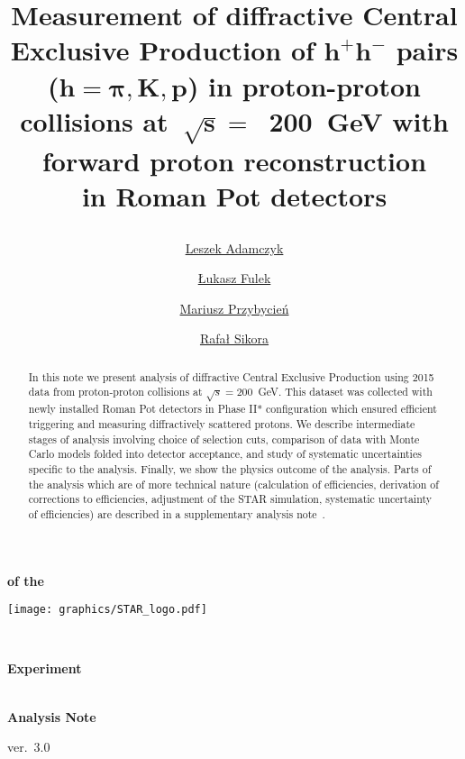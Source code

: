 \documentclass[a4paper,10pt,notitlepage]{report}
\title{%
\centering\hspace*{-0.08\linewidth}\begin{minipage}{1.16\linewidth}\centering%
\textbf{Measurement of diffractive Central Exclusive Production of $\bm{h^{+}h^{-}}$ pairs ($\bm{h=\pi,K,p}$) in proton-proton collisions at~$\bm{\sqrt{s}=}$~200~GeV with forward proton reconstruction\\in Roman Pot detectors}
\end{minipage}%
\vspace*{10pt}}
\author[ ]{\href{mailto:leszek.adamczyk@agh.edu.pl}{Leszek Adamczyk}}
\author[ ]{\href{mailto:lukasz.fulek@fis.agh.edu.pl}{Łukasz Fulek}}
\author[ ]{\href{mailto:mariusz.przybycien@agh.edu.pl}{Mariusz Przybycień}}
\author[ ]{\href{mailto:rafal.sikora@fis.agh.edu.pl}{Rafał Sikora}}
\affil[ ]{AGH University of Science and Technology, FPACS, Kraków, Poland}
\begin{document}
\begin{center}
\begin{minipage}[c]{0.12\linewidth}%
\vspace{5.5pt}\textbf{\LARGE{of the}}
\end{minipage}
\begin{minipage}[c]{0.15\linewidth}%
\hspace*{-8pt}\texttt{[image: graphics/STAR\_logo.pdf]}
\end{minipage}~
\begin{minipage}[c]{0.24\linewidth}%
\vspace{9pt}\hspace*{-8pt}\textbf{\LARGE{Experiment}}
\end{minipage}\\[-50pt]
\textbf{\LARGE{Analysis Note}}

\vspace*{150pt}
\begin{minipage}{\linewidth}
\maketitle
\begin{abstract}
In this note we present analysis of diffractive Central Exclusive Production using 2015 data from proton-proton collisions at $\sqrt{s}=200$~GeV. This dataset was collected with newly installed Roman Pot detectors in Phase II* configuration which ensured efficient triggering and measuring diffractively scattered protons. We describe intermediate stages of analysis involving choice of selection cuts, comparison of data with Monte Carlo models folded into detector acceptance, and study of systematic uncertainties specific to the analysis. Finally, we show the physics outcome of the analysis. Parts of the analysis which are of more technical nature (calculation of efficiencies, derivation of corrections to efficiencies, adjustment of the STAR simulation, systematic uncertainty of efficiencies) are described in a supplementary analysis note~\cite{supplementaryNote}.
\end{abstract}
\thispagestyle{empty}
\end{minipage}

\vspace{50pt}

ver.~3.0
\end{center}


\clearpage
\thispagestyle{empty}
\end{document}
